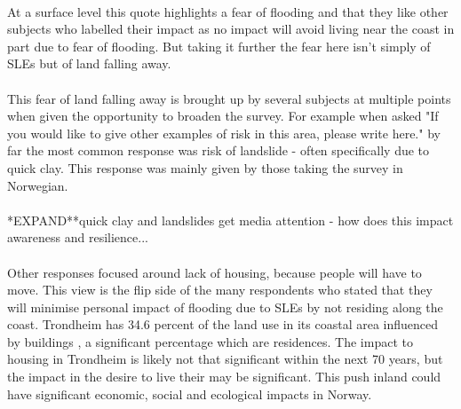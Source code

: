 \paragraph{}

At a surface level this quote highlights a fear of flooding and that they like other subjects who labelled their impact as no impact will avoid living near the coast in part due to fear of flooding. But taking it further the fear here isn't simply of SLEs but of land falling away. 
\paragraph{}

This fear of land falling away is brought up by several subjects at multiple points when given the opportunity to broaden the survey. For example when asked "If you would like to give other examples of risk in this area, please write here." by far the most common response was risk of landslide - often specifically due to quick clay. This response was mainly given by those taking the survey in Norwegian. 
\paragraph{}
*EXPAND**quick clay and landslides get media attention - how does this impact awareness and resilience...
\paragraph{}

Other responses focused around lack of housing, because people will have to move. This view is the flip side of the many respondents who stated that they will minimise personal impact of flooding due to SLEs by not residing along the coast. 
Trondheim has 34.6 percent of the land use in its coastal area influenced by buildings \cite{engebakken_construction_2022}, a significant percentage which are residences. The impact to housing in Trondheim is likely not that significant within the next 70 years, but the impact in the desire to live their may be significant. This push inland could have significant economic, social and ecological impacts in Norway. 
\paragraph{}



